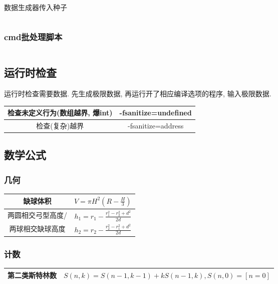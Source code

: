 \documentclass[utf8]{ctexart}
\begin{document}
数据生成器传入种子

\inputminted[linenos,breaklines,tabsize=4,mathescape,texcl]{bash}{codes/check-bash.sh}

\subsubsection{cmd批处理脚本}
\inputminted[linenos,breaklines,tabsize=4,mathescape,texcl]{bat}{codes/check-bat.bat}

\subsection{运行时检查}

运行时检查需要数据. 先生成极限数据, 再运行开了相应编译选项的程序, 输入极限数据.

\begin{spacing}{2}
\begin{center}
\begin{tabular}{ |c|c| }
	\hline
	检查未定义行为(数组越界, 爆int)	& -fsanitize=undefined		\\
	\hline
	检查(复杂)越界					& -fsanitize=address		\\
	\hline
\end{tabular}
\end{center}
\end{spacing}

\subsection{数学公式}

\subsubsection{几何}

\begin{spacing}{2}
\begin{center}
\begin{tabular}{ |c|c| }
	\hline
	缺球体积				& $V = \pi H^2\left(R-\frac{H}{3}\right)$		\\
	\hline
	两圆相交弓型高度/		& $h_1 = r_1 - \frac{r_1^2 - r_2^2 + d^2}{2d}$	\\
	两球相交缺球高度		& $h_2 = r_2 - \frac{r_2^2 - r_1^2 + d^2}{2d}$	\\
	\hline
\end{tabular}
\end{center}
\end{spacing}

\subsubsection{计数}

\begin{spacing}{2}
\begin{center}
\begin{tabular}{ |c|c| }
	\hline
	第二类斯特林数				& $S(n, k) = S(n-1, k-1) + k S(n-1, k), S(n, 0) = [n = 0]$		\\
	\hline
\end{tabular}
\end{center}
\end{spacing}
\end{document}
